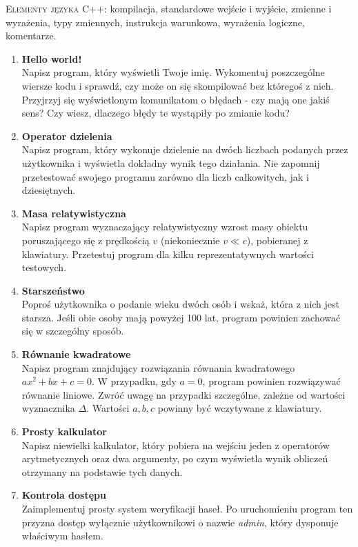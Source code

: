 \documentclass[12pt]{article}
\begin{document}
\small \textsc{Elementy języka C++:} kompilacja, standardowe wejście i wyjście, zmienne i wyrażenia, typy zmiennych, instrukcja warunkowa, wyrażenia logiczne, komentarze.

\begin{enumerate}

\item \textbf{Hello world!}\\
Napisz program, który wyświetli Twoje imię. Wykomentuj poszczególne wiersze kodu i sprawdź, czy może on się skompilować bez któregoś z nich. Przyjrzyj się wyświetlonym komunikatom o błędach - czy mają one jakiś sens? Czy wiesz, dlaczego błędy te wystąpiły po zmianie kodu?

\item \textbf{Operator dzielenia}\\
Napisz program, który wykonuje dzielenie na dwóch liczbach podanych przez użytkownika i wyświetla dokładny wynik tego działania. Nie zapomnij przetestować swojego programu zarówno dla liczb całkowitych, jak i dziesiętnych.

\item \textbf{Masa relatywistyczna}\\
Napisz program wyznaczający relatywistyczny wzrost masy obiektu poruszającego się z prędkością $v$ (niekoniecznie $v\ll c$), pobieranej z klawiatury. Przetestuj program dla kilku reprezentatywnych wartości testowych.

\item \textbf{Starszeństwo}\\
Poproś użytkownika o podanie wieku dwóch osób i wskaż, która z nich jest starsza. Jeśli obie osoby mają powyżej 100 lat, program powinien zachować się w szczególny sposób.

\item \textbf{Równanie kwadratowe}\\
Napisz program znajdujący rozwiązania równania kwadratowego $ax^2+bx+c=0$. W przypadku, gdy $a=0$, program powinien rozwiązywać równanie liniowe. Zwróć uwagę na przypadki szczególne, zależne od wartości wyznacznika $\Delta$. Wartości $a,b,c$ powinny być wczytywane z klawiatury.

\item \textbf{Prosty kalkulator}\\
Napisz niewielki kalkulator, który pobiera na wejściu jeden z operatorów arytmetycznych oraz dwa argumenty, po czym wyświetla wynik obliczeń otrzymany na podstawie tych danych.

\item \textbf{Kontrola dostępu}\\
Zaimplementuj prosty system weryfikacji haseł. Po uruchomieniu program ten przyzna dostęp wyłącznie użytkownikowi o nazwie \textit{admin}, który dysponuje właściwym hasłem.


\end{enumerate}
\end{document}
